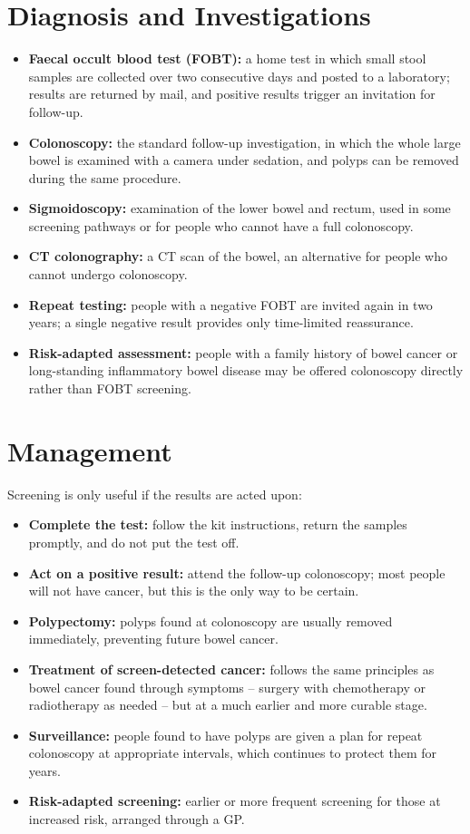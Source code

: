 \section*{Diagnosis and Investigations}
\begin{itemize}
    \item \textbf{Faecal occult blood test (FOBT):} a home test in which small stool samples are collected over two consecutive days and posted to a laboratory; results are returned by mail, and positive results trigger an invitation for follow-up.
    \item \textbf{Colonoscopy:} the standard follow-up investigation, in which the whole large bowel is examined with a camera under sedation, and polyps can be removed during the same procedure.
    \item \textbf{Sigmoidoscopy:} examination of the lower bowel and rectum, used in some screening pathways or for people who cannot have a full colonoscopy.
    \item \textbf{CT colonography:} a CT scan of the bowel, an alternative for people who cannot undergo colonoscopy.
    \item \textbf{Repeat testing:} people with a negative FOBT are invited again in two years; a single negative result provides only time-limited reassurance.
    \item \textbf{Risk-adapted assessment:} people with a family history of bowel cancer or long-standing inflammatory bowel disease may be offered colonoscopy directly rather than FOBT screening.
\end{itemize}

\section*{Management}
Screening is only useful if the results are acted upon:
\begin{itemize}
    \item \textbf{Complete the test:} follow the kit instructions, return the samples promptly, and do not put the test off.
    \item \textbf{Act on a positive result:} attend the follow-up colonoscopy; most people will not have cancer, but this is the only way to be certain.
    \item \textbf{Polypectomy:} polyps found at colonoscopy are usually removed immediately, preventing future bowel cancer.
    \item \textbf{Treatment of screen-detected cancer:} follows the same principles as bowel cancer found through symptoms -- surgery with chemotherapy or radiotherapy as needed -- but at a much earlier and more curable stage.
    \item \textbf{Surveillance:} people found to have polyps are given a plan for repeat colonoscopy at appropriate intervals, which continues to protect them for years.
    \item \textbf{Risk-adapted screening:} earlier or more frequent screening for those at increased risk, arranged through a GP.
\end{itemize}

